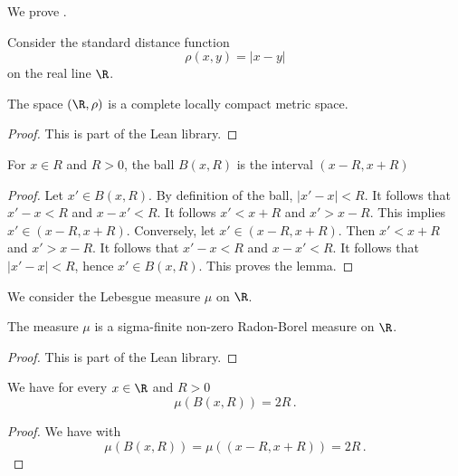 We prove .

Consider the standard distance function
\begin{equation}
    \rho(x,y)=|x-y|
\end{equation}
on the real line $\R$.
\begin{lemma}
\label{real-line-metric}
\leanok
{}
The space $(\R,\rho)$ is a complete locally compact metric space.
\end{lemma}
\begin{proof}
    \leanok
    This is part of the Lean library.
\end{proof}
\begin{lemma}
\label{real-line-ball}
    \leanok
    For $x\in R$ and $R>0$, the ball $B(x,R)$ is the interval $(x-R,x+R)$
\end{lemma}
\begin{proof}
\leanok
Let $x'\in B(x,R)$. By definition of the ball,
$|x'-x|<R$. It follows that $x'-x<R$ and $x-x'<R$.
It follows $x'<x+R$ and $x'>x-R$. This implies
$x'\in (x-R,x+R)$.
Conversely, let $x'\in (x-R,x+R)$. Then
$x'<x+R$ and $x'>x-R$. It follows that
$x'-x<R$ and $x-x'<R$. It follows that $|x'-x|<R$,
hence $x'\in B(x,R)$.
This proves the lemma.
\end{proof}
We consider the Lebesgue measure $\mu$ on $\R$.
\begin{lemma}
\label{real-line-measure}
\leanok
{}
    The measure $\mu$ is a sigma-finite non-zero
    Radon-Borel measure on $\R$.
\end{lemma}
\begin{proof}
    \leanok
    This is part of the Lean library.
\end{proof}
\begin{lemma}
\label{real-line-ball-measure}
    \leanok
    We have for every $x\in \R$ and $R>0$
    \begin{equation}
        \mu(B(x,R))=2R\, .
    \end{equation}
\end{lemma}
\begin{proof}
\leanok
We have with 
\begin{equation}
    \mu(B(x,R))=\mu((x-R,x+R))=2R\, .
\end{equation}
\end{proof}

